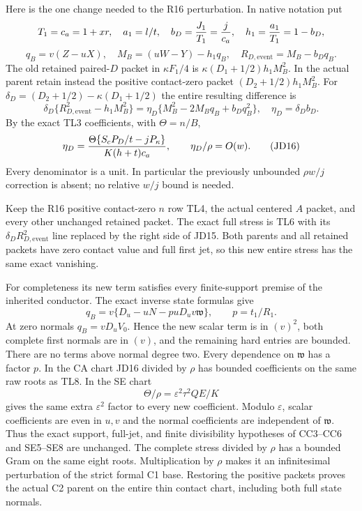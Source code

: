 Here is the one change needed to the R16 perturbation.  In native
notation put
\[
 T_1=c_a=1+xr,\quad a_1=l/t,\quad
 b_D={J_1\over T_1}={j\over c_a},\quad
 h_1={a_1\over T_1}=1-b_D,
\]
\[
 q_B=v(Z-uX),\quad M_B=(uW-Y)-h_1q_B,
 \quad R_{D,\mathrm{event}}=M_B-b_Dq_B.               \tag{JD14}
\]
The old retained paired-$D$ packet in $\kappa F_1/4$ is
$\kappa(D_1+1/2)h_1M_B^2$.  In the actual parent retain instead
the positive contact-zero packet $(D_2+1/2)h_1M_B^2$.
For $\delta_D=(D_2+1/2)-\kappa(D_1+1/2)$ the entire resulting
difference is
\[
 \boxed{\quad
 \delta_D\{R_{D,\mathrm{event}}^2-h_1M_B^2\}
 =\eta_D\{M_B^2-2M_Bq_B+b_Dq_B^2\},\quad
 \eta_D=\delta_D b_D.\quad}                          \tag{JD15}
\]
By the exact TL3 coefficients, with $\Theta=n/B$,
\[
 \eta_D={\Theta\{S_cP_D/t-jP_\kappa\}
                    \over K(h+t)c_a},\qquad
       \eta_D/\rho=O(w).                            \tag{JD16}
\]
Every denominator is a unit.  In particular the previously unbounded
$\rho w/j$ correction is absent; no relative $w/j$ bound is needed.

Keep the R16 positive contact-zero $n$ row TL4, the actual centered
$A$ packet, and every other unchanged retained packet.  The exact
full stress is TL6 with its $\delta_D R_{D,\mathrm{event}}^2$
line replaced by the right side of JD15.  Both parents and all
retained packets have zero contact value and full first jet, so this
new entire stress has the same exact vanishing.

For completeness its new term satisfies every finite-support premise
of the inherited conductor.  The exact inverse state formulas give
\[
 q_B=v\{D_u-uN-puD_uv\mathfrak w\},\qquad p=t_1/R_1.
                                                               \tag{JD17}
\]
At zero normals $q_B=vD_uV_0$.  Hence the new scalar term is in
$(v)^2$, both complete first normals are in $(v)$, and the remaining
hard entries are bounded.  There are no terms above normal degree
two.  Every dependence on $\mathfrak w$ has a factor $p$.
In the CA chart JD16 divided by $\rho$ has bounded coefficients
on the same raw roots as TL8.  In the SE chart
\[
 \Theta/\rho=\varepsilon^2\tau^2QE/K
\]
gives the same extra $\varepsilon^2$ factor to every new coefficient.
Modulo $\varepsilon$, scalar coefficients are even in $u,v$ and
the normal coefficients are independent of $\mathfrak w$.
Thus the exact support, full-jet, and finite divisibility hypotheses
of CC3--CC6 and SE5--SE8 are unchanged.  The complete stress divided
by $\rho$ has a bounded Gram on the same eight roots.  Multiplication
by $\rho$ makes it an infinitesimal perturbation of the strict formal
C1 base.  Restoring the positive packets proves the actual C2 parent
on the entire thin contact chart, including both full state normals.


